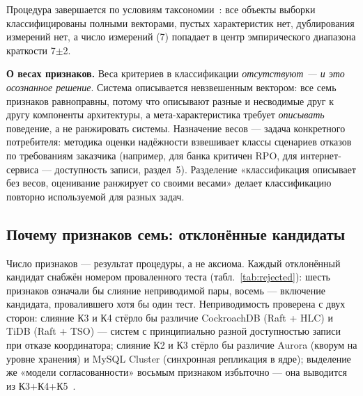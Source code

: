 \documentclass{misisarticle}
\begin{document}
Процедура завершается по условиям таксономии~\cite{nickerson}: все объекты выборки классифицированы полными векторами, пустых характеристик нет, дублирования измерений нет, а число измерений (7) попадает в центр эмпирического диапазона краткости 7$\pm$2.

\textbf{О весах признаков.} Веса критериев в классификации \emph{отсутствуют --- и это осознанное решение}. Система описывается невзвешенным вектором: все семь признаков равноправны, потому что описывают разные и несводимые друг к другу компоненты архитектуры, а мета-характеристика требует \emph{описывать} поведение, а не ранжировать системы. Назначение весов --- задача конкретного потребителя: методика оценки надёжности взвешивает классы сценариев отказов по требованиям заказчика (например, для банка критичен RPO, для интернет-сервиса --- доступность записи, раздел~5). Разделение «классификация описывает без весов, оценивание ранжирует со своими весами» делает классификацию повторно используемой для разных задач.

\subsection{Почему признаков семь: отклонённые кандидаты}

Число признаков --- результат процедуры, а не аксиома. Каждый отклонённый кандидат снабжён номером проваленного теста (табл.~\ref{tab:rejected}): шесть признаков означали бы слияние неприводимой пары, восемь --- включение кандидата, провалившего хотя бы один тест. Неприводимость проверена с двух сторон: слияние К3 и К4 стёрло бы различие CockroachDB (Raft + HLC) и TiDB (Raft + TSO) --- систем с принципиально разной доступностью записи при отказе координатора; слияние К2 и К3 стёрло бы различие Aurora (кворум на уровне хранения) и MySQL Cluster (синхронная репликация в ядре); выделение же «модели согласованности» восьмым признаком избыточно --- она выводится из К3+К4+К5~\cite{abadi,bailis}.
\end{document}
